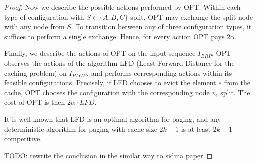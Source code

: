 \documentclass[manuscript,screen=true, review, anonymous]{acmart}
\begin{document}
\begin{proof}
Now we describe the possible actions performed by OPT.
Within each type of configuration with $S \in \{ A, B, C\}$ split, OPT may exchange the split node with any node from $S$.
To transition between any of three configuration types, it suffices to perform a single exchange.
Hence, for every action OPT pays $2\alpha$.

Finally, we describe the actions of OPT on the input sequence $I_{BRP}$.
OPT observes the actions of the algorithm LFD (Least Forward Distance for the caching problem) on $I_{PAGE}$, and performs corresponding actions within its feasible configurations.
Precisely, if LFD chooses to evict the element $e$ from the cache, OPT chooses the configuration with the corresponding node $v_e$ split.
The cost of OPT is then $2\alpha \cdot LFD$.

It is well-known that LFD is an optimal algorithm for paging, and any deterministic algorithm for paging with cache size $2k-1$ is at least $2k-1$-competitive.

TODO: rewrite the conclusion in the similar way to sidma paper
\end{proof}
\end{document}
